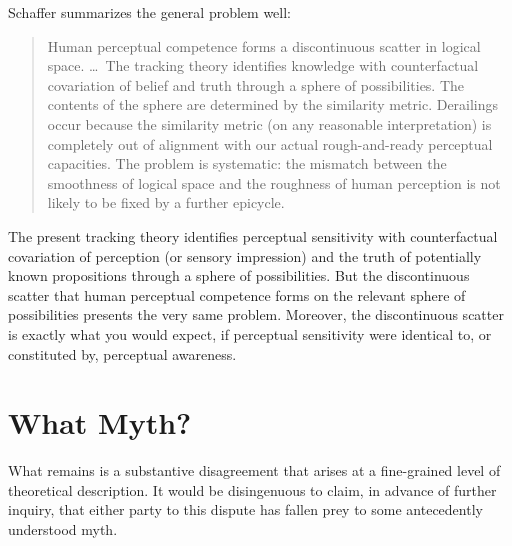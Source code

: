 \documentclass[12pt]{article}
\begin{document}
Schaffer summarizes the general problem well:
\begin{quote}
    Human perceptual competence forms a discontinuous scatter in logical space. \ldots\ The tracking theory identifies knowledge with counterfactual covariation of belief and truth through a sphere of possibilities. The contents of the sphere are determined by the similarity metric. Derailings occur because the similarity metric (on any reasonable interpretation) is completely out of alignment with our actual rough-and-ready perceptual capacities. The problem is systematic: the mismatch between the smoothness of logical space and the roughness of human perception is not likely to be fixed by a further epicycle. \citep[42]{Schaffer:2003vn}
\end{quote}
The present tracking theory identifies perceptual sensitivity with counterfactual covariation of perception (or sensory impression) and the truth of potentially known propositions through a sphere of possibilities. But the discontinuous scatter that human perceptual competence forms on the relevant sphere of possibilities presents the very same problem. Moreover, the discontinuous scatter is exactly what you would expect, if perceptual sensitivity were identical to, or constituted by, perceptual awareness. 



\section{What Myth?} %
\label{sec:what_myth_}

What remains is a substantive disagreement that arises at a fine-grained level of theoretical description. It would be disingenuous to claim, in advance of further inquiry, that either party to this dispute has fallen prey to some antecedently understood myth.


 
 
\end{document}
